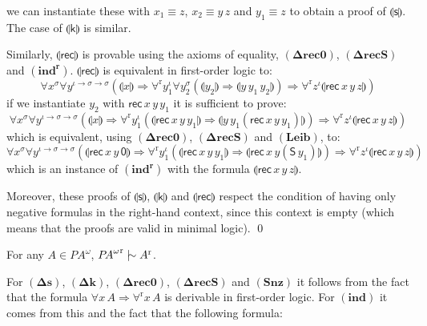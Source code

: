 \documentclass{CSML}
\newcommand*\Derives{\mathrel{|\mkern-8.75mu\sim}}
\newcommand*\SortTo\to
\newcommand*\SortA{\sigma}
\newcommand*\LogSortedTerm[2]{#1^{#2}}
\newcommand*\LogVarA{x}
\newcommand*\LogVarB{y}
\newcommand*\LogVarC{z}
\newcommand*\LogConst[1]{\mathsf{#1}}
\newcommand*\LogImp{\mathbin{\Rightarrow}}
\newcommand*\LogRel[1]{\llparenthesis#1\rrparenthesis}
\newcommand*\LogRelForm[1]{{#1^\mathrm{r}}}
\newcommand*\LogForallRel{\forall^\mathrm{r}}
\newcommand*\LogFormA{A}
\newcommand*\PA{{P\!A}}
\newcommand*\PAom{{\PA^\omega}}
\newcommand*\CASort\iota
\newcommand*\CALogs{\LogConst{s}}
\newcommand*\CALogk{\LogConst{k}}
\newcommand*\CALogZ{\LogConst{0}}
\newcommand*\CALogS{\LogConst{S}}
\newcommand*\CALogrec{\LogConst{rec}}
\newcommand*\CAAxName[1]{{\bm{\scriptstyle(#1)}}}
\newcommand*\CALeibName{\CAAxName{Leib}}
\newcommand*\CAdefsName{\CAAxName{\Delta s}}
\newcommand*\CAdefkName{\CAAxName{\Delta k}}
\newcommand*\CAdefrecZName{\CAAxName{\Delta rec0}}
\newcommand*\CAdefrecSName{\CAAxName{\Delta recS}}
\newcommand*\CASnZName{\CAAxName{Snz}}
\newcommand*\CAindUnrelName{\CAAxName{ind}}
\newcommand*\CAindName{\CAAxName{ind^r}}
\newcommand*\CARelsNoType{\LogRel{\CALogs}}
\newcommand*\CARelkNoType{\LogRel{\CALogk}}
\newcommand*\CARelrecNoType{\LogRel{\CALogrec}}
\begin{document}
we can instantiate these with $\LogVarA_1\equiv\LogVarC$, $\LogVarA_2\equiv\LogVarB\,\LogVarC$ and $\LogVarB_1\equiv\LogVarC$ to obtain a proof of $\CARelsNoType$. The case of $\CARelkNoType$ is similar.\par
Similarly, $\CARelrecNoType$ is provable using the axioms of equality, $\CAdefrecZName$, $\CAdefrecSName$ and $\CAindName$. $\CARelrecNoType$ is equivalent in first-order logic to:
$$\forall\LogSortedTerm{\LogVarA}{\SortA}\forall\LogSortedTerm{\LogVarB}{\CASort\SortTo\SortA\SortTo\SortA}\left(\LogRel{\LogVarA}\LogImp\LogForallRel\LogSortedTerm{\LogVarB_1}{\CASort}\forall\LogSortedTerm{\LogVarB_2}{\SortA}\left(\LogRel{\LogVarB_2}\LogImp\LogRel{\LogVarB\,\LogVarB_1\,\LogVarB_2}\right)\LogImp\LogForallRel\LogSortedTerm{\LogVarC}{\CASort}\LogRel{\CALogrec\,\LogVarA\,\LogVarB\,\LogVarC}\right)$$
if we instantiate $\LogVarB_2$ with $\CALogrec\,\LogVarA\,\LogVarB\,\LogVarB_1$ it is sufficient to prove:
$$\forall\LogSortedTerm{\LogVarA}{\SortA}\forall\LogSortedTerm{\LogVarB}{\CASort\SortTo\SortA\SortTo\SortA}\left(\LogRel{\LogVarA}\LogImp\LogForallRel\LogSortedTerm{\LogVarB_1}{\CASort}\left(\LogRel{\CALogrec\,\LogVarA\,\LogVarB\,\LogVarB_1}\LogImp\LogRel{\LogVarB\,\LogVarB_1\left(\CALogrec\,\LogVarA\,\LogVarB\,\LogVarB_1\right)}\right)\LogImp\LogForallRel\LogSortedTerm{\LogVarC}{\CASort}\LogRel{\CALogrec\,\LogVarA\,\LogVarB\,\LogVarC}\right)$$
which is equivalent, using $\CAdefrecZName$, $\CAdefrecSName$ and $\CALeibName$, to:
$$\forall\LogSortedTerm{\LogVarA}{\SortA}\forall\LogSortedTerm{\LogVarB}{\CASort\SortTo\SortA\SortTo\SortA}\left(\LogRel{\CALogrec\,\LogVarA\,\LogVarB\,\CALogZ}\LogImp\LogForallRel\LogSortedTerm{\LogVarB_1}{\CASort}\left(\LogRel{\CALogrec\,\LogVarA\,\LogVarB\,\LogVarB_1}\LogImp\LogRel{\CALogrec\,\LogVarA\,\LogVarB\left(\CALogS\,\LogVarB_1\right)}\right)\LogImp\LogForallRel\LogSortedTerm{\LogVarC}{\CASort}\LogRel{\CALogrec\,\LogVarA\,\LogVarB\,\LogVarC}\right)$$
which is an instance of $\CAindName$ with the formula $\LogRel{\CALogrec\,\LogVarA\,\LogVarB\,\LogVarC}$.\par
Moreover, these proofs of $\CARelsNoType$, $\CARelkNoType$ and $\CARelrecNoType$ respect the condition of having only negative formulas in the right-hand context, since this context is empty (which means that the proofs are valid in minimal logic).
\qed
\begin{lem}
For any $\LogFormA\in\PAom$, $\LogRelForm{\PAom}\Derives\LogRelForm{\LogFormA}$.
\end{lem}
\proof
For $\CAdefsName$, $\CAdefkName$, $\CAdefrecZName$, $\CAdefrecSName$ and $\CASnZName$ it follows from the fact that the formula $\forall\LogVarA\,\LogFormA\LogImp\LogForallRel\LogVarA\,\LogFormA$ is derivable in first-order logic. For $\CAindUnrelName$ it comes from this and the fact that the following formula:
\end{document}
